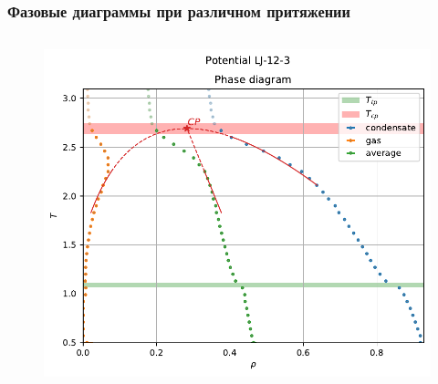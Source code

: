 \documentclass[pdf,hyperref={unicode}]{beamer}
\begin{document}
\begin{frame}
\begin{columns}
\begin{column}{0.55\linewidth}
\end{column}

\end{columns}
\end{frame}




\begin{frame}
\transdissolve[duration=0.2]
\frametitle{Фазовые диаграммы при различном притяжении}

\begin{columns}

\begin{column}{0.55\linewidth}

\begin{figure}[h]
\begin{center}
\begin{minipage}[h]{0.47\linewidth}
\includegraphics[width=\textwidth, keepaspectratio]{plot_phase_diagram_Potential LJ-12-3_1}
\end{minipage}
\begin{minipage}[h]{0.47\linewidth}

\end{minipage}
\end{center}
\end{figure}
\end{column}
\end{columns}
\end{frame}
\end{document}
